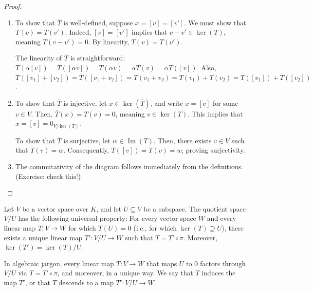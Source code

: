 \begin{proof}
  \begin{enumerate}
    \item To show that $\overline{T}$ is well-defined, suppose $x = [v] = [v']$. We must show that $T(v) = T(v')$. Indeed, $[v] = [v']$ implies that $v - v' \in \ker(T)$, meaning $T(v - v') = 0$. By linearity, $T(v) = T(v')$.

    The linearity of $\overline{T}$ is straightforward: $\overline{T}(\alpha[v]) = \overline{T}([\alpha v]) = T(\alpha v) = \alpha T(v) = \alpha \overline{T}([v])$. Also, $\overline{T}([v_1] + [v_2]) = \overline{T}([v_1 + v_2]) = T(v_1 + v_2) = T(v_1) + T(v_2) = \overline{T}([v_1]) + \overline{T}([v_2])$.

    \item To show that $\overline{T}$ is injective, let $x \in \ker(\overline{T})$, and write $x = [v]$ for some $v \in V$. Then, $\overline{T}(x) = T(v) = 0$, meaning $v \in \ker(T)$. This implies that $x = [v] = 0_{V/\ker(T)}$.

    To show that $\overline{T}$ is surjective, let $w \in \operatorname{Im}(T)$. Then, there exists $v \in V$ such that $T(v) = w$. Consequently, $\overline{T}([v]) = T(v) = w$, proving surjectivity.

    \item The commutativity of the diagram follows immediately from the definitions. (Exercise: check this!)
  \end{enumerate}
\end{proof}

\begin{theorem}
  Let $V$ be a vector space over $K$, and let $U \subseteq V$ be a subspace. The quotient space $V/U$ has the following universal property: For every vector space $W$ and every linear map $T \colon V \to W$ for which $T(U) = 0$ (i.e., for which $\ker(T) \supseteq U$), there exists a unique linear map $T' \colon V/U \to W$ such that $T = T' \circ \pi$. Moreover, $\ker(T') = \ker(T)/U$.
\end{theorem}

\begin{remark}
  In algebraic jargon, every linear map $T \colon V \to W$ that maps $U$ to $0$ factors through $V/U$ via $T = T' \circ \pi$, and moreover, in a unique way. We say that $T$ induces the map $T'$, or that $T$ descends to a map $T' \colon V/U \to W$.
\end{remark}


